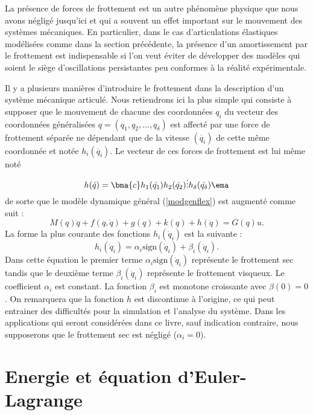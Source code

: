 La présence de forces de frottement est un autre phénomène physique que nous avons 
négligé jusqu'ici et qui a souvent un effet important sur le mouvement 
des systèmes mécaniques. En particulier, dans le cas d'articulations élastiques
modélisées comme dans la section précédente, la présence d'un amortissement 
par le frottement est indispensable si l'on veut éviter de développer des modèles 
qui soient le siège d'oscillations persistantes peu conformes à la réalité 
expérimentale.

Il y a plusieurs manières d'introduire le frottement dans la description d'un système
mécanique articulé. Nous retiendrons ici la plus simple qui consiste à supposer
que le mouvement de chacune des coordonnées $q_i$ du vecteur des coordonnées 
généralisées $q = (q_1, q_2, \hdots , q_\delta)$ est affecté par une force de frottement
séparée ne dépendant que de la vitesse $(\dot{q_i})$ de cette même coordonnée et
notée $h_i(\dot{q_i})$. Le vecteur de ces forces de frottement est lui même noté
$$
h(\dot{q}) = \bma{c} h_1(\dot{q_1}) \\ h_2(\dot{q_2}) \\ \vdots \\ h_{\delta}(\dot{q_\delta}) \ema
$$
de sorte que le modèle dynamique général (\ref{modgenflex}) est augmenté comme suit :
$$
M(q)\ddot{q} + f(q,\dot q) + g(q) + k(q) + h(\dot{q}) = G(q)u. \label{modgenflexfrot}
$$
La forme la plus courante des fonctions $h_i(\dot q_i)$ est la suivante :
$$
h_i(\dot q_i) = \alpha_{i}\mbox{sign}(\dot q_i) + \beta_i(\dot q_i).
$$
Dans cette équation le premier terme $\alpha_{i}\mbox{sign}(\dot q_i)$ représente le frottement
sec tandis que le deuxième terme $\beta_i(\dot q_i)$ représente le frottement
visqueux. Le coefficient $\alpha_i$ est constant. La fonction $\beta_i$ est monotone croissante avec $\beta(0) = 0$. On remarquera que la fonction $h$ est discontinue à l'origine, ce
qui peut entrainer des difficultés pour la simulation et l'analyse du système. Dans les applications qui seront considérées dans ce livre, sauf indication contraire, nous supposerons que le frottement sec est négligé ($\alpha_i = 0$).

\section{Energie et équation d'Euler-Lagrange} 

